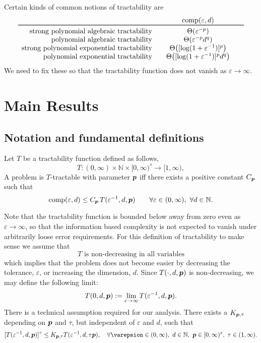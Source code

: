 \documentclass[11pt,a4paper]{article}
\newcommand{\fred}[1]{\begingroup\color{blue}#1\endgroup}
\begin{document}
Certain kinds of common notions of tractability are
\begin{equation*}
    \begin{array}{r@{\qquad}c@{\qquad}c}
    & \comp(\varepsilon, d)\\
    \toprule
    \text{strong polynomial algebraic  tractability} & \Theta(\varepsilon^{-p})\\
    \text{polynomial algebraic tractability} & \Theta(\varepsilon^{-p}d^{q})\\
    \text{strong polynomial exponential tractability} &  \Theta\bigl([\log(1 + \varepsilon^{-1})]^p\bigr)\\
    \text{polynomial exponential tractability} & \Theta\bigl([\log(1 + \varepsilon^{-1})]^p  d^{q}\bigr)
    \end{array}
\end{equation*}
\fred{We need to fix these so that the tractability function does not vanish as $\varepsilon \to \infty$.}


\section{Main Results}

\subsection{Notation and fundamental definitions}
Let $T$ be a tractability function defined as follows,
\[
T :(0,\infty) \times \mathbb{N} \times [0,\infty)^s \rightarrow [1,\infty),
\]
A problem is $T$-tractable with parameter $\boldsymbol{p}$ iff there exists a positive constant $C_{\boldsymbol{p}}$ such that
\begin{equation} \label{comp_def}
	\operatorname{comp}(\varepsilon,d) \le C_{\boldsymbol{p}}\, T(\varepsilon^{-1},d,\boldsymbol{p}) \qquad \forall \varepsilon \in (0,\infty), \ \forall d \in \mathbb{N}.
\end{equation}

Note that the tractability function is bounded below away from zero even as $\varepsilon \to \infty$, so that the information based complexity is not expected to vanish under arbitrarily loose error requirements.  For this definition of tractability to make sense we assume that
\begin{equation}
	T \text{ is non-decreasing in all variables}
\end{equation}
which implies that the problem does not become easier by decreasing the tolerance, $\varepsilon$, or increasing the dimension, $d$. Since $T(\cdot,d,\boldsymbol{p})$ is non-decreasing, we may define the following limit:
\begin{equation}
	T(0,d,\boldsymbol{p}):=\lim_{\varepsilon\to\infty}T(\varepsilon^{-1},d,\boldsymbol{p}).
\end{equation}
There is a technical assumption required for our analysis.  There exists a $K_{\boldsymbol{p},\tau}$ depending on $\boldsymbol{p}$ and $\tau$, but  independent of $\varepsilon$ and $d$, such that
\begin{equation} \label{eq:ptauassume}
	[T(\varepsilon^{-1},d,\vp)]^\tau \le K_{\vp,\tau} T(\varepsilon^{-1},d,\tau \vp),   \quad \forall \varepsion \in (0,\infty), \ d \in \naturals, \ \vp\in[0,\infty)^s, \ \tau\in (1,\infty).
\end{equation}
\end{document}
